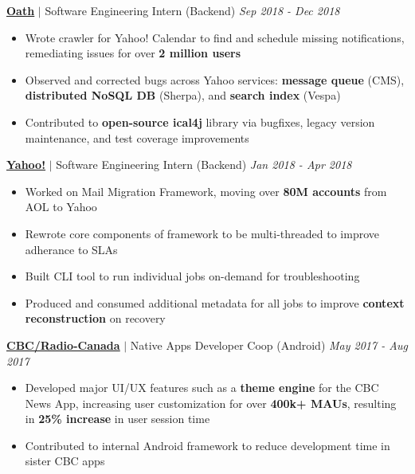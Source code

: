 \documentclass[paper=a4,fontsize=15pt]{scrartcl}
\newcommand{\smolboispace}{\vspace*{0.1em}}
\newcommand{\bighalfspace}{\vspace*{0.75em}}
\begin{document}
\smolboispace
\smolboispace
\bighalfspace
\normalsize
\noindent \href{https://mail.yahoo.com}{\textbf{\ul{Oath}}}
$\vert$ \small Software Engineering Intern (Backend)
{\hfill \footnotesize \textit{Sep 2018 - Dec 2018}}
\begin{itemize}[noitemsep,leftmargin=20pt,label=\raisebox{0.25ex}{\tiny$\bullet$},topsep=5pt]
  \small
    \item Wrote crawler for Yahoo! Calendar to find and schedule missing notifications, remediating issues for over \textbf{2 million users}
    \item Observed and corrected bugs across Yahoo services: \textbf{message queue} (CMS), \textbf{distributed NoSQL DB} (Sherpa), and \textbf{search index} (Vespa)
    \item Contributed to \textbf{open-source ical4j} library via bugfixes, legacy version maintenance, and test coverage improvements
\end{itemize}

\smolboispace
\smolboispace
\bighalfspace
\normalsize
\noindent \href{https://mail.yahoo.com}{\textbf{\ul{Yahoo!}}}
$\vert$ \small Software Engineering Intern (Backend)
{\hfill \footnotesize \textit{Jan 2018 - Apr 2018}}
\begin{itemize}[noitemsep,leftmargin=20pt,label=\raisebox{0.25ex}{\tiny$\bullet$},topsep=5pt]
  \small
    \item Worked on Mail Migration Framework, moving over \textbf{80M accounts} from AOL to Yahoo
    \item Rewrote core components of framework to be multi-threaded to improve adherance to SLAs
    \item Built CLI tool to run individual jobs on-demand for troubleshooting
    \item Produced and consumed additional metadata for all jobs to improve \textbf{context reconstruction} on recovery
\end{itemize}

\smolboispace
\smolboispace
\bighalfspace
\normalsize
\noindent \href{https://cbc.ca}{\ul{\textbf{CBC/Radio-Canada}}}
$\vert$ \small Native Apps Developer Coop (Android)
{\hfill \footnotesize \textit{May 2017 - Aug 2017}}
\begin{itemize}[noitemsep,leftmargin=20pt,label=\raisebox{0.25ex}{\tiny$\bullet$},topsep=5pt]
  \small
    \item Developed major UI/UX features such as a \textbf{theme engine} for the CBC News App, increasing user customization for over \textbf{400k+ MAUs}, resulting in \textbf{25\% increase} in user session time
    \item Contributed to internal Android framework to reduce development time in sister CBC apps
\end{itemize}
\end{document}
